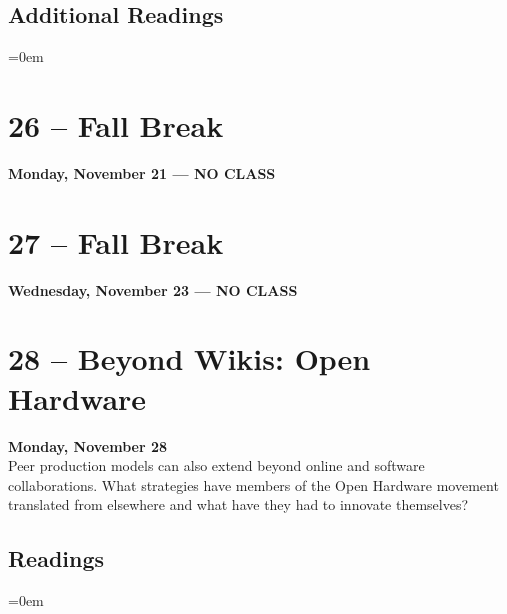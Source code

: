 \documentclass[10pt]{memoir}
\newenvironment{readinglist}{
\begin{list}{}{\leftmargin=8pt \itemindent=0em}
  \setlength{\itemsep}{8pt}
  \setlength{\parskip}{0em}
  \setlength{\parsep}{1em}
  \setlength{\parindent}{8em}}
{\end{list}}
\begin{document}
    \subsection{Additional Readings}
    \begin{readinglist}
        \item {}
        \item {}
        \item {}
        \item {}
        \item {}
        \item {}
    \end{readinglist}
    
\section{26 -- Fall Break}
\textcolor{CUGold}{\textbf{Monday, November 21  --- NO CLASS}}

\section{27 -- Fall Break}
\textcolor{CUGold}{\textbf{Wednesday, November 23 --- NO CLASS}}

\section{28 -- Beyond Wikis: Open Hardware}
\textcolor{CUGold}{\textbf{Monday, November 28}}\\
Peer production models can also extend beyond online and software collaborations. What strategies have members of the Open Hardware movement translated from elsewhere and what have they had to innovate themselves?

    \subsection{Readings}
    \begin{readinglist}
        \item {}
        \item {}
        \item {}
    \end{readinglist}
    
\end{document}

